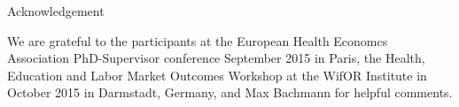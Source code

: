 \documentclass[12pt,english,british]{article}
\begin{document}
Acknowledgement

We are grateful to the participants at the European Health Economcs Association PhD-Supervisor conference September 2015 in Paris, the Health, Education and Labor Market Outcomes Workshop at the WifOR Institute in October 2015 in Darmstadt, Germany, and Max Bachmann for helpful comments.

\noindent  

%


\end{document}

